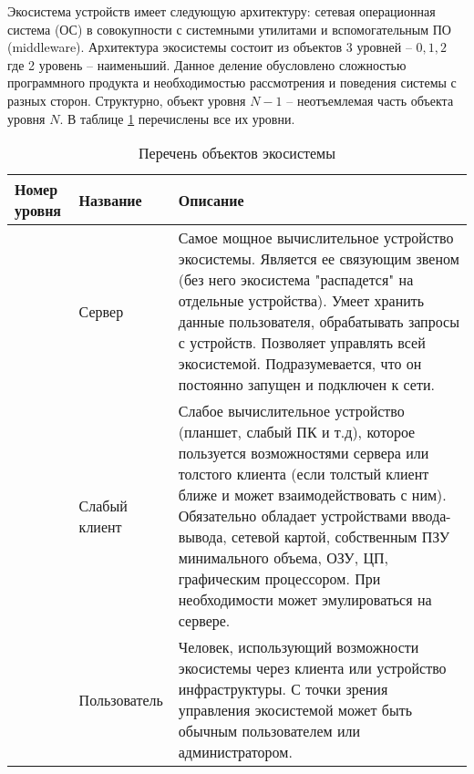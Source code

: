 Экосистема устройств имеет следующую архитектуру: сетевая операционная система (ОС) в совокупности с системными утилитами и вспомогательным ПО (middleware).
Архитектура экосистемы состоит из объектов 3 уровней -- \(0,1,2\) где 2 уровень -- наименьший. Данное деление обусловлено сложностью программного продукта и необходимостью рассмотрения и поведения системы с разных сторон. Структурно, объект уровня \(N-1\) -- неотъемлемая часть объекта уровня \(N\). В таблице \ref{table-objects} перечислены все их уровни.
\captionsetup{labelfont=bf,
   justification=raggedright,
   singlelinecheck=false}
\begin{table}[htpb]
   \captionsetup{justification=raggedright,labelfont=md,textfont=md}
   \caption{Перечень объектов экосистемы}
   \label{table-objects}
   \centering
   \begin{tabularx}{\textwidth}{|>{\centering}p{}|p{}|X|}
      \cline{1-3}
      Номер уровня & Название                    & Описание                                                                                                                                                                                                                                                                                                                                                                         \\ \hline
      0            & Сервер                      & Самое мощное вычислительное устройство экосистемы. Является ее связующим звеном (без него экосистема "распадется" на отдельные устройства). Умеет хранить данные пользователя, обрабатывать запросы с устройств. Позволяет управлять всей экосистемой. Подразумевается, что он постоянно запущен и подключен к сети.                                                             \\ \hline
      0            & Слабый клиент               & Слабое вычислительное устройство (планшет, слабый ПК и т.д), которое пользуется возможностями сервера или толстого клиента (если толстый клиент ближе и может взаимодействовать с ним). Обязательно обладает устройствами ввода-вывода, сетевой картой, собственным ПЗУ минимального объема, ОЗУ, ЦП, графическим процессором. При необходимости может эмулироваться на сервере. \\ \hline
      0            & Пользователь                & Человек, использующий возможности экосистемы через клиента или устройство инфраструктуры. С точки зрения управления экосистемой может быть обычным пользователем или администратором.                                                                                                                                                                                            \\ \hline

\end{tabularx}
\end{table}
